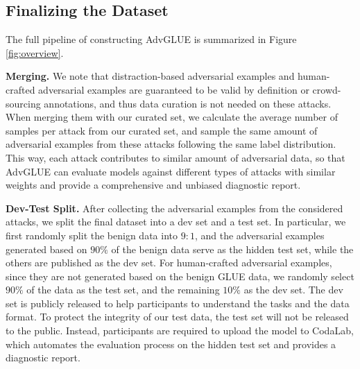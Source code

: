 \documentclass{article}
\newcommand{\method}{AdvGLUE\xspace}
\begin{document}
\subsection{Finalizing the Dataset}
The full pipeline of constructing  \method is summarized in Figure \ref{fig:overview}. 


\textbf{Merging.}  We note that distraction-based adversarial examples and human-crafted adversarial examples are guaranteed to be valid by definition or crowd-sourcing annotations, and thus data curation is not needed on these attacks. When merging them with our curated set, 
we calculate the average number of samples per attack from our curated set, and sample the same amount of adversarial examples from these attacks following the same label distribution. This way, each  attack contributes to similar amount of adversarial data, so that \method can evaluate models against different types of  attacks with similar weights and provide a comprehensive and unbiased diagnostic report.

\textbf{Dev-Test Split.} After collecting the adversarial examples from the considered  attacks, we split the final dataset into a dev set and a test set. In particular, we first randomly split the benign data into $9:1$, and the adversarial examples generated based on $90\%$ of the benign data serve as the hidden test set, while the others are published as the dev set. For human-crafted adversarial examples, since they are not generated based on the benign GLUE data, we randomly select $90\%$ of the data as the test set, and the remaining $10\%$ as the dev set.
The dev set is publicly released to help participants to understand the tasks and the data format. To protect the integrity of our test data, the test set will not be released to the public. Instead, participants are required to upload the model to CodaLab, which automates the evaluation process on the hidden test set and provides a diagnostic report. 
\end{document}
